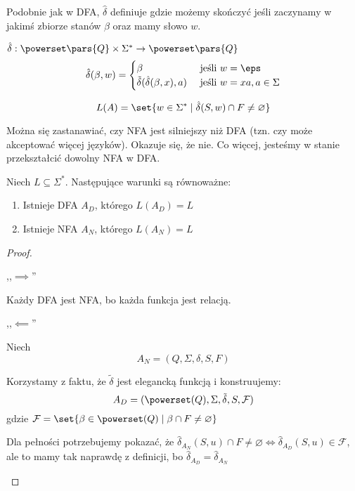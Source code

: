 Podobnie jak w DFA, \( \hat \delta \) definiuje gdzie możemy skończyć jeśli zaczynamy w jakimś zbiorze stanów \( \beta \) oraz mamy słowo \( w \).
\begin{definition}
	\( \hat \delta : \powerset\pars{Q} \times \Sigma^* \rightarrow \powerset\pars{Q} \)
	\[
		\hat \delta(\beta, w) = \begin{cases}
			\beta                                   & \text{ jeśli } w = \eps             \\
			\tilde \delta(\hat \delta(\beta, x), a) & \text{ jeśli } w = xa, a \in \Sigma \\
		\end{cases}
	\]
\end{definition}

\begin{definition}
	\[
		L(A) = \set{w \in \Sigma^* \mid \hat \delta(S, w) \cap F \neq \varnothing}
	\]
\end{definition}

Można się zastanawiać, czy NFA jest silniejszy niż DFA (tzn. czy może akceptować więcej języków).
Okazuje się, że nie. Co więcej, jesteśmy w stanie przekształcić dowolny NFA w DFA.
\begin{theorem}
	Niech \( L \subseteq \Sigma^* \).
	Następujące warunki są równoważne:
	\begin{enumerate}
		\item Istnieje DFA \( A_D \), którego \( L(A_D) = L \)
		\item Istnieje NFA \( A_N \), którego \( L(A_N) = L \)
	\end{enumerate}
\end{theorem}
\begin{proof}
	\begin{description}
		\item ,,\( \implies \)''

		      Każdy DFA jest NFA, bo każda funkcja jest relacją.

		\item ,,\( \impliedby \)''

		      Niech
		      \[ A_N = (Q, \Sigma, \delta, S, F) \]

		      Korzystamy z faktu, że \( \tilde \delta \) jest elegancką funkcją i konstruujemy:
		      \[ A_D = (\powerset(Q), \Sigma, \tilde \delta, S, \mathcal{F}) \]
		      gdzie \( \mathcal{F} = \set{\beta \in \powerset(Q) \mid \beta \cap F \neq \varnothing} \)

		      Dla pełności potrzebujemy pokazać, że \( \hat \delta_{A_N}(S, u) \cap F \neq \varnothing \iff \hat \delta_{A_D}(S, u) \in \mathcal{F} \),
		      ale to mamy tak naprawdę z definicji, bo \( \hat \delta_{A_D} = \hat \delta_{A_N} \)
	\end{description}
\end{proof}

